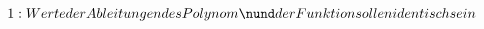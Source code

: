 \documentclass[preview]{standalone}
\begin{document}
\begin{align*}
1: Werte der Ableitungen des Polynom \nund der Funktion sollen identisch sein
\end{align*}
\end{document}
